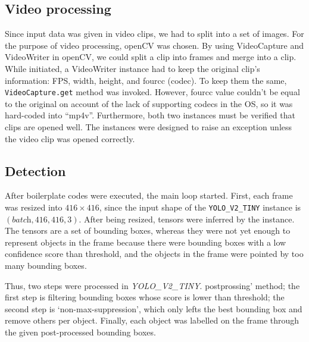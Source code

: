\documentclass[a4paper,12pt]{article}
\begin{document}
\subsection{Video processing}
Since input data was given in video clips, we had to split into a set of images. For the purpose of video processing, openCV was chosen. By using VideoCapture and VideoWriter in openCV, we could split a clip into frames and merge into a clip. While initiated, a VideoWriter instance had to keep the original clip’s information: FPS, width, height, and fourcc (codec). To keep them the same, \lstinline{VideoCapture.get} method was invoked. However, fourcc value couldn’t be equal to the original on account of the lack of supporting codecs in the OS, so it was hard-coded into “mp4v”.
Furthermore, both two instances must be verified that clips are opened well. The instances were designed to raise an exception unless the video clip was opened correctly.

\subsection{Detection}
After boilerplate codes were executed, the main loop started.
 First, each frame was resized into $416 \times 416$, since the input shape of the \lstinline{YOLO_V2_TINY} instance is $(\textit{batch}, 416, 416, 3)$.
 After being resized, tensors were inferred by the instance.
 The tensors are a set of bounding boxes, whereas they were not yet enough to represent objects in the frame because there were bounding boxes with a low confidence score than threshold, and the objects in the frame were pointed by too many bounding boxes.

Thus, two steps were processed in \emph{YOLO\_V2\_TINY}.
postprossing’ method; the first step is filtering bounding boxes whose score is lower than threshold; the second step is ‘non-max-suppression’, which only lefts the best bounding box and remove others per object.
Finally, each object was labelled on the frame through the given post-processed bounding boxes. 
\end{document}
